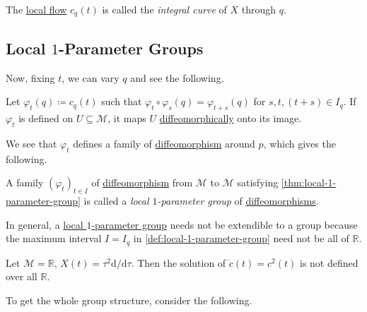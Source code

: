 \begin{center}
\end{center}

\begin{definition}\label{def:integral-curve}
	The \hyperref[def:local-flow]{local flow} \(c_q(t)\) is called the \emph{integral curve} of \(X\) through \(q\).
\end{definition}

\subsection{Local \(1\)-Parameter Groups}
Now, fixing \(t\), we can vary \(q\) and see the following.

\begin{theorem}\label{thm:local-1-parameter-group}
	Let \(\varphi _t(q) \coloneqq c_q(t)\) such that \(\varphi _t \circ \varphi _s(q) = \varphi _{t+s}(q)\) for \(s, t, (t+s)\in I_q\). If \(\varphi _t\) is defined on \(U \subseteq \mathcal{M} \), it maps \(U\) \hyperref[def:diffeomorphic]{diffeomorphically} onto its image.
\end{theorem}

We see that \(\varphi _t\) defines a family of \hyperref[def:diffeomorphism]{diffeomorphism} around \(p\), which gives the following.

\begin{definition}\label{def:local-1-parameter-group}
	A family \((\varphi _t)_{t\in I}\) of \hyperref[def:diffeomorphism]{diffeomorphism} from \(\mathcal{M} \) to \(\mathcal{M} \) satisfying \autoref{thm:local-1-parameter-group} is called a \emph{local \(1\)-parameter group} of \hyperref[def:diffeomorphism]{diffeomorphisms}.
\end{definition}

In general, a \hyperref[def:local-1-parameter-group]{local \(1\)-parameter group} needs not be extendible to a group because the maximum interval \(I = I_q\) in \autoref{def:local-1-parameter-group} need not be all of \(\mathbb{R} \).

\begin{eg}
	Let \(\mathcal{M} = \mathbb{R} \), \(X(t) = \tau ^2 \mathrm{d} / \mathrm{d} \tau \). Then the solution of \(\dot{c}(t) = c^2(t)\) is not defined over all \(\mathbb{R} \).
\end{eg}

To get the whole group structure, consider the following.

